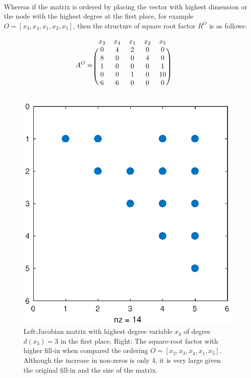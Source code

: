 \paragraph{}
Whereas if the matrix is ordered by placing the vector with highest dimension or the node with the highest degree at the first place, for example $O = [x_3, x_4, x_1, x_2, x_5]$, then the structure of square root factor $R^O$ is as follows:
\begin{figure}[H]
\begin{minipage}{0.5\textwidth}
\centering
\[ 
A^O = 
\begin{blockarray}{cccccc}
x_3 & x_4 & x_1 & x_2 & x_5 & \\
\begin{block}{(ccccc)c}
0  &   4  &   2  &   0  &   0 & \\
8  &   0  &   0  &   4  &   0 & \\
1  &   0  &   0  &   0  &   1 & \\
0  &   0  &   1  &   0  &  10 & \\
6  &   6  &   0  &   0  &   0 & \\
\end{block}
\end{blockarray}
\]
\end{minipage}
\begin{minipage}{0.5\textwidth}
\centering
\includegraphics[width=\textwidth]{Chapters/figures2/sample_R_bad}
\end{minipage}
\caption{Left:Jacobian matrix with highest degree variable $x_3$ of degree $d(x_3)=3$ in the first place. Right: The square-root factor with higher fill-in when compared the ordering $O = [x_2, x_3, x_4, x_1, x_5]$. Although the increase in non-zeros is only 4, it is very large given the original fill-in and the size of the matrix.}
\label{fig:bad_ordering}
\end{figure}
